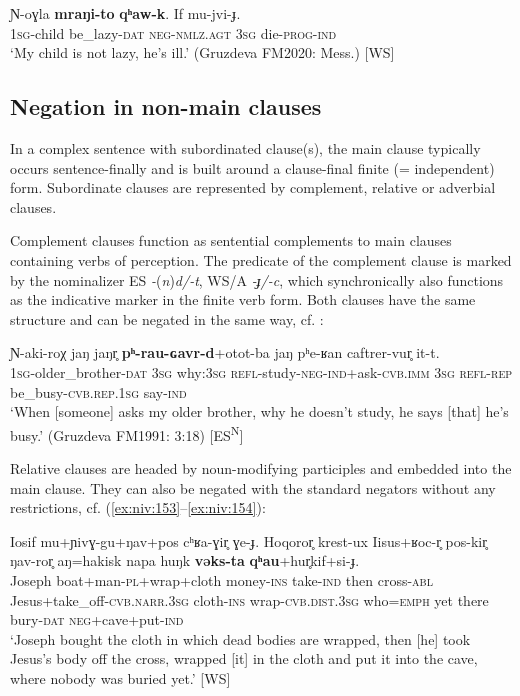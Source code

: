 \documentclass[output=paper,colorlinks,citecolor=brown]{langscibook}
\begin{document}
\ea\label{ex:niv:73}
    \gll Ɲ-oɣla \textbf{mraŋi-to} \textbf{qʰaw-k}. If mu-jvi-ɟ. \\ 
         \textsc{1sg}{}-child be\_lazy-\textsc{dat} \textsc{neg-nmlz.agt} \textsc{3sg} die-\textsc{prog-ind} \\
    \glt ‘My child is not lazy, he’s ill.’ (Gruzdeva FM2020: Mess.) [WS]
\z 

\subsection{Negation in non-main clauses}\label{sec:niv:2.4}
In a complex sentence with subordinated clause(s), the main clause typically occurs sentence-finally and is built around a clause-final finite (= independent) form. Subordinate clauses are represented by complement, relative or adverbial clauses.

Complement clauses function as sentential complements to main clauses containing verbs of perception. The predicate of the complement clause is marked by the nominalizer ES \textit{-}(\textit{n})\textit{d/-t}, WS/A \textit{-ɟ/-c}, which synchronically also functions as the indicative marker in the finite verb form. Both clauses have the same structure and can be negated in the same way, cf. :

\ea\label{ex:niv:152}
    \gll Ɲ-aki-roχ jaŋ jaŋr̥ \textbf{pʰ-rau-ɢavr-d}+otot-ba  jaŋ pʰe-ʁan caftrer-vur̥ it-t.\\ 
         \textsc{1sg}{}-older\_brother{}-\textsc{dat} \textsc{3sg} why:\textsc{3sg} \textsc{refl-}study-\textsc{neg-ind}+ask-\textsc{cvb.imm} \textsc{3sg} \textsc{refl-rep} be\_busy-\textsc{cvb.rep.1sg} say-\textsc{ind} \\
    \glt ‘When [someone] asks my older brother, why he doesn’t study, he says [that] he’s busy.’ (Gruzdeva FM1991: 3:18) [ES\textsuperscript{N}]
\z 

Relative clauses are headed by noun-modifying participles and embedded into the main clause. They can also be negated with the standard negators without any restrictions, cf. (\ref{ex:niv:153}--\ref{ex:niv:154}):

\ea\label{ex:niv:153}
    \gll Iosif mu+ɲivɣ{}-gu+ŋav+pos cʰʁa-ɣir̥ ɣe-ɟ. Hoqoror̥ krest-ux Iisus+ʁoc-r̥ pos-kir̥  ŋav-ror̥ aŋ=hakisk napa huŋk \textbf{vəks-ta} \textbf{qʰau}+hur̥kif+si-ɟ.  \\ 
         Joseph boat+man-\textsc{pl}+wrap+cloth money-\textsc{ins} take-\textsc{ind} then cross-\textsc{abl} Jesus+take\_off-\textsc{cvb.narr.3sg} cloth-\textsc{ins} wrap-\textsc{cvb.dist.3sg} who=\textsc{emph} yet there bury-\textsc{dat} \textsc{neg}+cave+put\textsc{{}-ind} \\
    \glt ‘Joseph bought the cloth in which dead bodies are wrapped, then [he] took Jesus’s body off the cross, wrapped [it] in the cloth and put it into the cave, where nobody was buried yet.’ \citep[156]{Histories2017} [WS]
\z 
\end{document}
